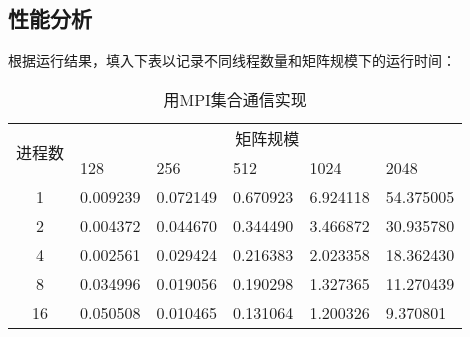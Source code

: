 \documentclass{SYSUReport}
\begin{document}
\subsection{性能分析}
根据运行结果，填入下表以记录不同线程数量和矩阵规模下的运行时间：
\begin{table}[H]
\centering
\caption{用MPI集合通信实现}
\label{表1}
\begin{tabular}{|c|lllll|}
\hline
\multirow{2}{*}{进程数} & \multicolumn{5}{c|}{矩阵规模}                                                                        \\ \cline{2-6} 
 & \multicolumn{1}{l|}{128} & \multicolumn{1}{l|}{256} & \multicolumn{1}{l|}{512} & \multicolumn{1}{l|}{1024} & 2048 \\ \hline
1                    & \multicolumn{1}{l|}{0.009239} & \multicolumn{1}{l|}{0.072149} & \multicolumn{1}{l|}{0.670923} & \multicolumn{1}{l|}{6.924118} & 54.375005 \\ \hline
2                    & \multicolumn{1}{l|}{0.004372} & \multicolumn{1}{l|}{0.044670} & \multicolumn{1}{l|}{0.344490} & \multicolumn{1}{l|}{3.466872} & 30.935780 \\ \hline
4                    & \multicolumn{1}{l|}{0.002561} & \multicolumn{1}{l|}{0.029424} & \multicolumn{1}{l|}{0.216383} & \multicolumn{1}{l|}{2.023358} & 18.362430 \\ \hline
8                    & \multicolumn{1}{l|}{0.034996} & \multicolumn{1}{l|}{0.019056} & \multicolumn{1}{l|}{0.190298} & \multicolumn{1}{l|}{1.327365} & 11.270439 \\ \hline
16                   & \multicolumn{1}{l|}{0.050508} & \multicolumn{1}{l|}{0.010465} & \multicolumn{1}{l|}{0.131064} & \multicolumn{1}{l|}{1.200326} & 9.370801 \\ \hline
\end{tabular}
\end{table}
\end{document}
